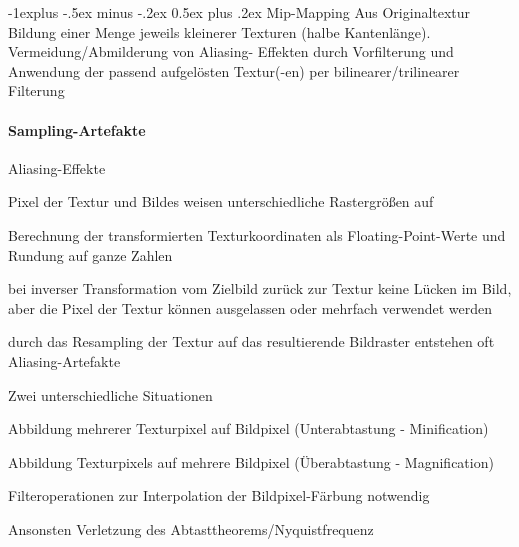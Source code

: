 \documentclass[landscape]{article}
\makeatletter
\renewcommand{\subsection}{\@startsection{subsection}{2}{0mm}%
                                {-1explus -.5ex minus -.2ex}%
                                {0.5ex plus .2ex}%
                                {\normalfont\normalsize\bfseries}}
\makeatother
\begin{document}
\begin{multicols}{3}
  \subsection{Mip-Mapping}
  Aus Originaltextur Bildung einer Menge jeweils kleinerer Texturen (halbe Kantenlänge).  
  Vermeidung/Abmilderung von Aliasing- Effekten durch Vorfilterung und Anwendung der passend aufgelösten Textur(-en) per bilinearer/trilinearer Filterung
  
  \paragraph{Sampling-Artefakte}
  Aliasing-Effekte
  \begin{itemize*}
    \item Pixel der Textur und Bildes weisen unterschiedliche Rastergrößen auf
    \item Berechnung der transformierten Texturkoordinaten als Floating-Point-Werte und Rundung auf ganze Zahlen
    \item bei inverser Transformation vom Zielbild zurück zur Textur keine Lücken im Bild, aber die Pixel der Textur können ausgelassen oder mehrfach verwendet werden
    \item durch das Resampling der Textur auf das resultierende Bildraster entstehen oft Aliasing-Artefakte
  \end{itemize*}
  
  Zwei unterschiedliche Situationen
  \begin{itemize*}
    \item Abbildung mehrerer Texturpixel auf Bildpixel (Unterabtastung - Minification)
    \item Abbildung Texturpixels auf mehrere Bildpixel (Überabtastung - Magnification)
    \item Filteroperationen zur Interpolation der Bildpixel-Färbung notwendig
    \item Ansonsten Verletzung des Abtasttheorems/Nyquistfrequenz
  \end{itemize*}
  

\end{multicols}
\end{document}
